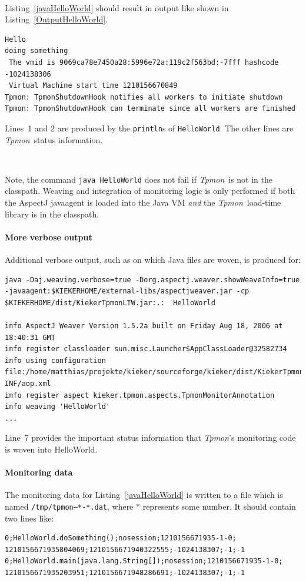 \documentclass[a4paper,12pt]{scrartcl}
\newcommand{\tpmon}{\textit{Tpmon}}
\begin{document}
\

Listing~\ref{javaHelloWorld} should result in output like shown in Listing~\ref{OutputHelloWorld}.
\begin{lstlisting}[caption={Compilation and execution with AspectJ's Java agent.},label={OutputHelloWorld}]
Hello
doing something
 The vmid is 9069ca78e7450a28:5996e72a:119c2f563bd:-7fff hashcode -1024138306
 Virtual Machine start time 1210156670849
Tpmon: TpmonShutdownHook notifies all workers to initiate shutdown
Tpmon: TpmonShutdownHook can terminate since all workers are finished
\end{lstlisting}
Lines~1 and 2 are produced by the \texttt{println}s of \texttt{HelloWorld}. The other lines are \tpmon\ status information.

\

Note, the command \texttt{java  HelloWorld} does not fail if  \tpmon\ is not in the classpath. Weaving and integration of monitoring logic is only performed if both the AspectJ javaagent is loaded into the Java VM \textit{and} the \tpmon\ load-time library is in the classpath.

\paragraph{More verbose output}
Additional verbose output, such as on which Java files are woven, is produced for:
\begin{lstlisting}[caption={Verbose execution with AspectJ's Java agent.},label={lst2}]
java -Daj.weaving.verbose=true -Dorg.aspectj.weaver.showWeaveInfo=true -javaagent:$KIEKERHOME/external-libs/aspectjweaver.jar -cp $KIEKERHOME/dist/KiekerTpmonLTW.jar:.:  HelloWorld

info AspectJ Weaver Version 1.5.2a built on Friday Aug 18, 2006 at 18:40:31 GMT
info register classloader sun.misc.Launcher$AppClassLoader@32582734
info using configuration file:/home/matthias/projekte/kieker/sourceforge/kieker/dist/KiekerTpmonLTW.jar!/META-INF/aop.xml
info register aspect kieker.tpmon.aspects.TpmonMonitorAnnotation
info weaving 'HelloWorld'
...
\end{lstlisting}
Line~7 provides the important status information that \tpmon's monitoring code is woven into HelloWorld.



\paragraph{Monitoring data}
The monitoring data for Listing~\ref{javaHelloWorld} is written to a file which is named \texttt{/tmp/tpmon--*-*.dat}, where $*$ represents some number. It should contain two lines like:
\begin{lstlisting}[caption={Example monitoring data},label={OutputHelloWorld2}]
0;HelloWorld.doSomething();nosession;1210156671935-1-0; 1210156671935804069;1210156671940322555;-1024138307;-1;-1
0;HelloWorld.main(java.lang.String[]);nosession;1210156671935-1-0; 1210156671935203951;1210156671948286691;-1024138307;-1;-1
\end{lstlisting}
\end{document}

